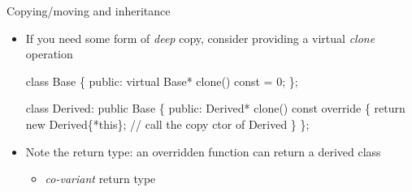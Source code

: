 \begin{frame}[fragile]{Copying/moving and inheritance \insertcontinuationtext}

  \begin{itemize}
  \item If you need some form of \textit{deep} copy, consider providing a
    virtual \textit{clone} operation

    \begin{codeblock}
class Base
\{
 public:
  virtual Base* clone() const = 0;
\};

class Derived: public Base
\{
 public:
  Derived* clone() const override
  \{
    return new Derived\{*this\}; // call the copy ctor of Derived
  \}
\};\end{codeblock}

  \item Note the return type: an overridden function can return a derived class
    \begin{itemize}
    \item \textit{co-variant} return type
    \end{itemize}
  \end{itemize}

\end{frame}
